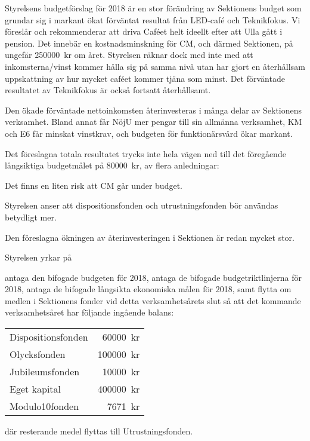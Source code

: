 \documentclass[../_main/handlingar.tex]{subfiles}
\begin{document}

Styrelsens budgetförslag för 2018 är en stor förändring av Sektionens budget som grundar sig i markant ökat förväntat resultat från LED-café och Teknikfokus. Vi föreslår och rekommenderar att driva Caféet helt ideellt efter att Ulla gått i pension. Det innebär en kostnadsminskning för CM, och därmed Sektionen, på ungefär \SI{250000}{kr} om året. Styrelsen räknar dock med inte med att inkomsterna/vinst kommer hålla sig på samma nivå utan har gjort en återhållsam uppskattning av hur mycket caféet kommer tjäna som minst. Det förväntade resultatet av Teknikfokus är också fortsatt återhållsamt.

Den ökade förväntade nettoinkomsten återinvesteras i många delar av Sektionens verksamhet. Bland annat får NöjU mer pengar till sin allmänna verksamhet, KM och E6 får minskat vinstkrav, och budgeten för funktionärsvård ökar markant.

Det föreslagna totala resultatet trycks inte hela vägen ned till det föregående långsiktiga budgetmålet på \SI{80000}{kr}, av flera anledningar:
\begin{tightdashlist}
    \item Det finns en liten risk att CM går under budget.
    \item Styrelsen anser att dispositionsfonden och utrustningsfonden bör användas betydligt mer.
    \item Den föreslagna ökningen av återinvesteringen i Sektionen är redan mycket stor.
\end{tightdashlist}

Styrelsen yrkar på

\begin{attsatser}
    \att antaga den bifogade budgeten för 2018,
    \att antaga de bifogade budgetriktlinjerna för 2018,
    \att antaga de bifogade långsikta ekonomiska målen för 2018, samt
    \att flytta om medlen i Sektionens fonder vid detta verksamhetsårets slut så att det kommande verksamhetsåret har följande ingående balans:\par
    \begin{tabular}{l r}
        Dispositionsfonden & \SI{60000}{kr}\\
        Olycksfonden & \SI{100000}{kr}\\
        Jubileumsfonden & \SI{10000}{kr}\\
        Eget kapital & \SI{400000}{kr}\\
        Modulo10fonden & \SI{7671}{kr}\\
    \end{tabular}\par
    där resterande medel flyttas till Utrustningsfonden.
\end{attsatser}
\end{document}
